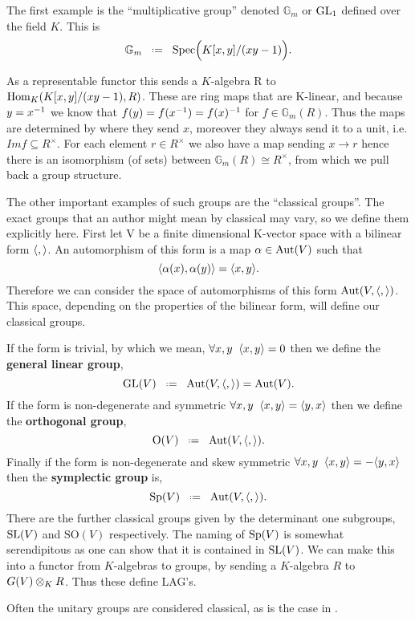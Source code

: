 \begin{example}[\(\mathbb{G}_m\)]
    The first example is the ``multiplicative group'' denoted \(\mathbb{G}_m\) or \(\operatorname{GL}_1\) defined over the field \(K\). This is 
    \[\mathbb{G}_m \defeq \Spec\Bigl( K[x,y]/(xy - 1)\Bigr).\]

    As a representable functor this sends a \(K\)-algebra R to \(\operatorname{Hom}_K(K[x,y]/(xy - 1), R)\). These are ring maps that are K-linear, and  because \(y = x^{-1}\) we know that \(f(y) = f(x^{-1}) = f(x)^{-1}\) for \(f\in \mathbb{G}_m(R)\). Thus the maps are determined by where they send \(x\), moreover they always send it to a unit, i.e. \(Im f \subseteq R^\times\). For each element \(r\in R^\times\) we also have a map sending \(x\to r\) hence there is an isomorphism (of sets) between \(\mathbb{G}_m(R) \cong R^\times\), from which we pull back a group structure.
\end{example}

The other important examples of such groups are the ``classical groups''. The exact groups that an author might mean by classical may vary, so we define them explicitly here. First let V be a finite dimensional K-vector space with a bilinear form \(\langle ,\rangle\). An automorphism of this form is a map \(\alpha\in \operatorname{Aut}(V)\) such that 
\[\langle \alpha(x), \alpha(y)\rangle = \langle x,y\rangle.\]
Therefore we can consider the space of automorphisms of this form \(\operatorname{Aut}(V, \langle ,\rangle)\). This space, depending on the properties of the bilinear form, will define our classical groups. 

If the form is trivial, by which we mean, \(\forall x,y \;\; \langle x, y\rangle = 0\) then we define the \textbf{general linear group},
\[\GL(V) \defeq \Aut(V, \inner{,}) = \Aut(V).\]
If the form is non-degenerate and symmetric \(\forall x,y \;\; \langle x, y\rangle = \langle y,x\rangle\) then we define the \textbf{orthogonal group},
\[\mathrm{O}(V) \defeq \Aut(V, \inner{,}).\]
Finally if the form is non-degenerate and skew symmetric \(\forall x,y \;\; \langle x, y\rangle = -\langle y,x\rangle\) then the \textbf{symplectic group} is,
\[\Sp(V) \defeq \Aut(V, \inner{,}).\]
There are the further classical groups given by the determinant one subgroups, \(\operatorname{SL}(V)\) and \(\mathrm{SO}(V)\) respectively. The naming of \(\operatorname{Sp}(V)\) is somewhat serendipitous as one can show that it is contained in \(\operatorname{SL}(V)\). We can make this into a functor from \(K\)-algebras to groups, by sending a \(K\)-algebra \(R\) to \(G(V)\otimes_K R\). Thus these define LAG's. 

\begin{remark}
    Often the unitary groups are considered classical, as is the case in \cite{jiangPolesCertainResidual2013}.
\end{remark}

